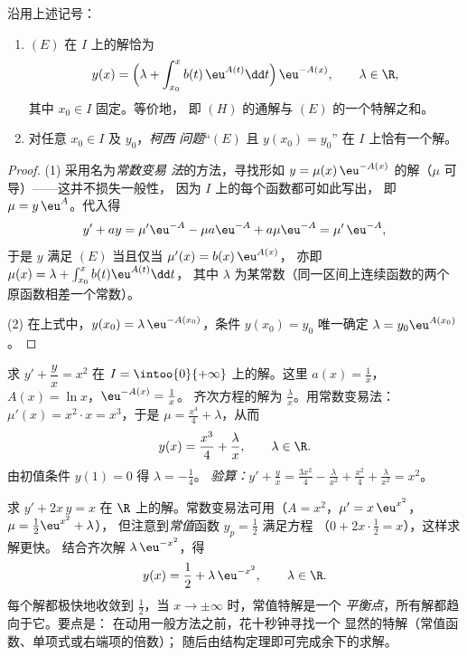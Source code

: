 \begin{theorem}\label{thm:b1:diffeq:voc}
沿用上述记号：
\begin{enumerate}
  \item $(E)$ 在 $I$ 上的解恰为
        \[
        y(x) = \Bigl(\lambda + \int_{x_0}^{x} b(t)\, \eu^{A(t)} \dd t
        \Bigr)\, \eu^{-A(x)},
        \qquad \lambda \in \R,
        \]
        其中 $x_0 \in I$ 固定。等价地，
        即 $(H)$ 的通解与 $(E)$ 的一个特解之和。
  \item 对任意 $x_0 \in I$ 及 $y_0$，\emph{柯西
        问题}“$(E)$ 且 $y(x_0) = y_0$”
        在 $I$ 上恰有一个解。
\end{enumerate}
\end{theorem}

\begin{proof}
(1) 采用名为\emph{常数变易
法}的方法，寻找形如
$y = \mu(x)\, \eu^{-A(x)}$ 的解（$\mu$ 可导）——这并不损失一般性，
因为 $I$ 上的每个函数都可如此写出，
即 $\mu = y\,\eu^{A}$。代入得
\[
y' + ay = \mu' \eu^{-A} - \mu a \eu^{-A} + a\mu\eu^{-A}
= \mu'\, \eu^{-A},
\]
于是 $y$ 满足 $(E)$ 当且仅当 $\mu'(x) = b(x)\,\eu^{A(x)}$，
亦即 $\mu(x) = \lambda + \int_{x_0}^x b(t)\eu^{A(t)}\dd t$，
其中 $\lambda$ 为某常数（同一区间上连续函数的两个
原函数相差一个常数）。

(2) 在上式中，$y(x_0) = \lambda\,\eu^{-A(x_0)}$，条件
$y(x_0) = y_0$ 唯一确定 $\lambda = y_0 \eu^{A(x_0)}$。
\end{proof}

\begin{example}\label{ex:b1:diffeq:order1}
求 $y' + \dfrac{y}{x} = x^2$ 在 $I = \intoo{0}{+\infty}$ 上的解。这里
$a(x) = \frac 1x$，$A(x) = \ln x$，$\eu^{-A(x)} = \frac 1x$。
齐次方程的解为 $\frac{\lambda}{x}$。用常数变易法：
$\mu'(x) = x^2 \cdot x = x^3$，于是 $\mu = \frac{x^4}{4} + \lambda$，从而
\[
y(x) = \frac{x^3}{4} + \frac{\lambda}{x}, \qquad \lambda \in \R .
\]
由初值条件 $y(1) = 0$ 得 $\lambda = -\frac14$。
\emph{验算：}$y' + \frac yx = \frac{3x^2}{4} - \frac{\lambda}{x^2} +
\frac{x^2}{4} + \frac{\lambda}{x^2} = x^2$。
\end{example}

\begin{example}[猜测胜过积分]\label{ex:b1:diffeq:guess}
求 $y' + 2x\,y = x$ 在 $\R$ 上的解。常数变易法可用（$A =
x^2$，$\mu' = x\,\eu^{x^2}$，$\mu = \frac12\eu^{x^2} + \lambda$），
但注意到\emph{常值}函数 $y_p = \frac12$ 满足方程
（$0 + 2x\cdot\frac12 = x$），这样求解更快。
结合齐次解 $\lambda\,\eu^{-x^2}$，得
\[
y(x) = \frac12 + \lambda\,\eu^{-x^2}, \qquad \lambda \in \R .
\]
每个解都极快地收敛到 $\frac12$，当 $x \to
\pm\infty$ 时，常值特解是一个
\emph{平衡点}，所有解都趋向于它。要点是：
在动用一般方法之前，花十秒钟寻找一个
显然的特解（常值函数、单项式或右端项的倍数）；
随后由结构定理即可完成余下的求解。
\end{example}

